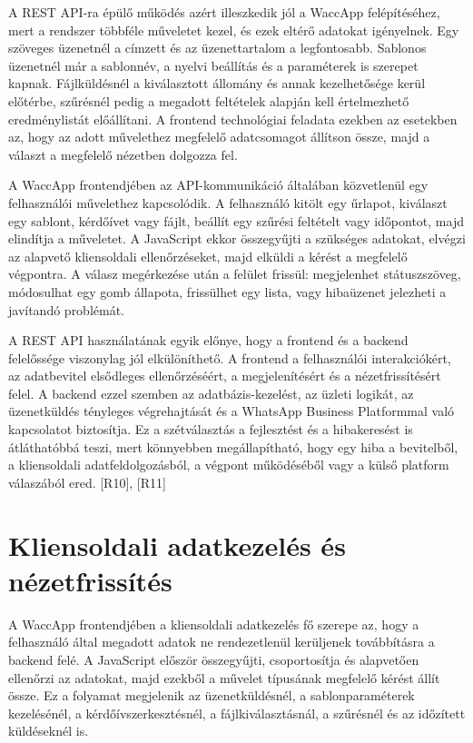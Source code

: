 A REST API-ra épülő működés azért illeszkedik jól a WaccApp felépítéséhez, mert a rendszer többféle műveletet kezel, és ezek eltérő adatokat igényelnek. Egy szöveges üzenetnél a címzett és az üzenettartalom a legfontosabb. Sablonos üzenetnél már a sablonnév, a nyelvi beállítás és a paraméterek is szerepet kapnak. Fájlküldésnél a kiválasztott állomány és annak kezelhetősége kerül előtérbe, szűrésnél pedig a megadott feltételek alapján kell értelmezhető eredménylistát előállítani. A frontend technológiai feladata ezekben az esetekben az, hogy az adott művelethez megfelelő adatcsomagot állítson össze, majd a választ a megfelelő nézetben dolgozza fel.

A WaccApp frontendjében az API-kommunikáció általában közvetlenül egy felhasználói művelethez kapcsolódik. A felhasználó kitölt egy űrlapot, kiválaszt egy sablont, kérdőívet vagy fájlt, beállít egy szűrési feltételt vagy időpontot, majd elindítja a műveletet. A JavaScript ekkor összegyűjti a szükséges adatokat, elvégzi az alapvető kliensoldali ellenőrzéseket, majd elküldi a kérést a megfelelő végpontra. A válasz megérkezése után a felület frissül: megjelenhet státuszszöveg, módosulhat egy gomb állapota, frissülhet egy lista, vagy hibaüzenet jelezheti a javítandó problémát.

A REST API használatának egyik előnye, hogy a frontend és a backend felelőssége viszonylag jól elkülöníthető. A frontend a felhasználói interakciókért, az adatbevitel elsődleges ellenőrzéséért, a megjelenítésért és a nézetfrissítésért felel. A backend ezzel szemben az adatbázis-kezelést, az üzleti logikát, az üzenetküldés tényleges végrehajtását és a WhatsApp Business Platformmal való kapcsolatot biztosítja. Ez a szétválasztás a fejlesztést és a hibakeresést is átláthatóbbá teszi, mert könnyebben megállapítható, hogy egy hiba a bevitelből, a kliensoldali adatfeldolgozásból, a végpont működéséből vagy a külső platform válaszából ered. [R10], [R11]

\section{Kliensoldali adatkezelés és nézetfrissítés}

A WaccApp frontendjében a kliensoldali adatkezelés fő szerepe az, hogy a felhasználó által megadott adatok ne rendezetlenül kerüljenek továbbításra a backend felé. A JavaScript először összegyűjti, csoportosítja és alapvetően ellenőrzi az adatokat, majd ezekből a művelet típusának megfelelő kérést állít össze. Ez a folyamat megjelenik az üzenetküldésnél, a sablonparaméterek kezelésénél, a kérdőívszerkesztésnél, a fájlkiválasztásnál, a szűrésnél és az időzített küldéseknél is.

